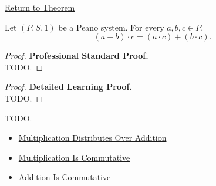 \newpage
{}
\label{prf:left-distributivity-of-multiplication-over-addition}

\begin{remark*}[Return]
\hyperref[thm:left-distributivity-of-multiplication-over-addition]{Return to Theorem}
\end{remark*}

\begin{theorem*}
Let $(P,S,1)$ be a Peano system. For every $a,b,c \in P$,
\[
(a+b)\cdot c=(a\cdot c)+(b\cdot c).
\]
\end{theorem*}

\begin{proof}
\textbf{Professional Standard Proof.}~\\
TODO.
\end{proof}

\begin{proof}
\textbf{Detailed Learning Proof.}~\\
TODO.
\end{proof}

\begin{remark*}
TODO.
\end{remark*}

\begin{dependencies}
\begin{itemize}
  \item \hyperref[thm:multiplication-distributes-over-addition]{Multiplication Distributes Over Addition}
  \item \hyperref[thm:multiplication-commutative]{Multiplication Is Commutative}
  \item \hyperref[thm:addition-commutative]{Addition Is Commutative}
\end{itemize}
\end{dependencies}